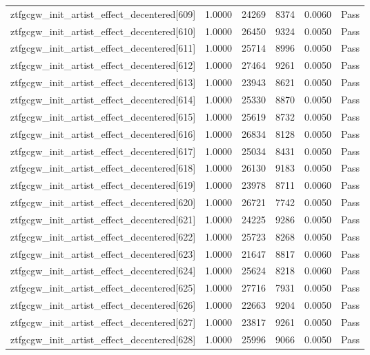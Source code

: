 \begin{table}[htbp]
\begin{tabular}{llrrll}
ztfgcgw\_init\_artist\_effect\_decentered[609] & 1.0000 & 24269 & 8374 & 0.0060 & Pass \\
ztfgcgw\_init\_artist\_effect\_decentered[610] & 1.0000 & 26450 & 9324 & 0.0050 & Pass \\
ztfgcgw\_init\_artist\_effect\_decentered[611] & 1.0000 & 25714 & 8996 & 0.0050 & Pass \\
ztfgcgw\_init\_artist\_effect\_decentered[612] & 1.0000 & 27464 & 9261 & 0.0050 & Pass \\
ztfgcgw\_init\_artist\_effect\_decentered[613] & 1.0000 & 23943 & 8621 & 0.0050 & Pass \\
ztfgcgw\_init\_artist\_effect\_decentered[614] & 1.0000 & 25330 & 8870 & 0.0050 & Pass \\
ztfgcgw\_init\_artist\_effect\_decentered[615] & 1.0000 & 25619 & 8732 & 0.0050 & Pass \\
ztfgcgw\_init\_artist\_effect\_decentered[616] & 1.0000 & 26834 & 8128 & 0.0050 & Pass \\
ztfgcgw\_init\_artist\_effect\_decentered[617] & 1.0000 & 25034 & 8431 & 0.0050 & Pass \\
ztfgcgw\_init\_artist\_effect\_decentered[618] & 1.0000 & 26130 & 9183 & 0.0050 & Pass \\
ztfgcgw\_init\_artist\_effect\_decentered[619] & 1.0000 & 23978 & 8711 & 0.0060 & Pass \\
ztfgcgw\_init\_artist\_effect\_decentered[620] & 1.0000 & 26721 & 7742 & 0.0050 & Pass \\
ztfgcgw\_init\_artist\_effect\_decentered[621] & 1.0000 & 24225 & 9286 & 0.0050 & Pass \\
ztfgcgw\_init\_artist\_effect\_decentered[622] & 1.0000 & 25723 & 8268 & 0.0050 & Pass \\
ztfgcgw\_init\_artist\_effect\_decentered[623] & 1.0000 & 21647 & 8817 & 0.0060 & Pass \\
ztfgcgw\_init\_artist\_effect\_decentered[624] & 1.0000 & 25624 & 8218 & 0.0060 & Pass \\
ztfgcgw\_init\_artist\_effect\_decentered[625] & 1.0000 & 27716 & 7931 & 0.0050 & Pass \\
ztfgcgw\_init\_artist\_effect\_decentered[626] & 1.0000 & 22663 & 9204 & 0.0050 & Pass \\
ztfgcgw\_init\_artist\_effect\_decentered[627] & 1.0000 & 23817 & 9261 & 0.0050 & Pass \\
ztfgcgw\_init\_artist\_effect\_decentered[628] & 1.0000 & 25996 & 9066 & 0.0050 & Pass \\

\end{tabular}
\end{table}
